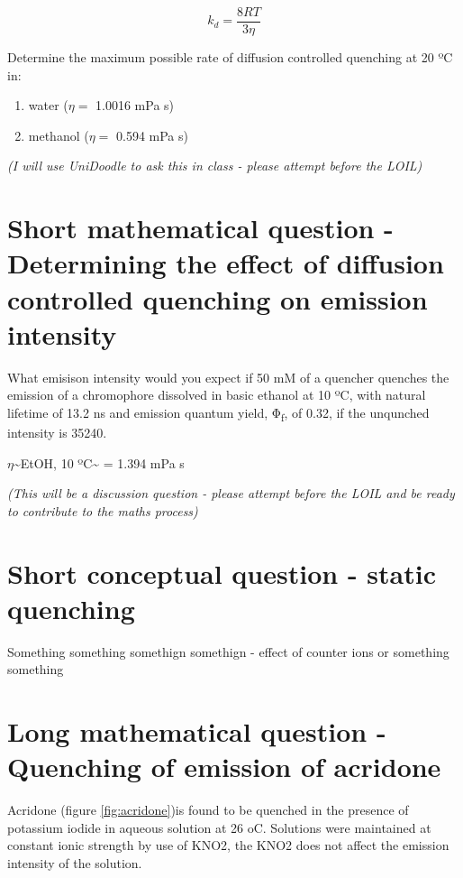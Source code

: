 \documentclass[
]{book}
\providecommand{\tightlist}{%
  \setlength{\itemsep}{0pt}\setlength{\parskip}{0pt}}
\begin{document}
\begin{equation}
k_d = \frac{8RT}{3 \eta}
\label{eq:diffcontrolrate}
\end{equation}

Determine the maximum possible rate of diffusion controlled quenching at 20 ºC in:

\begin{enumerate}
\def\labelenumi{\alph{enumi}.}
\tightlist
\item
  water (\(\eta=\) 1.0016 mPa s)
\item
  methanol (\(\eta=\) 0.594 mPa s)
\end{enumerate}

\emph{(I will use UniDoodle to ask this in class - please attempt before the LOIL)}

\hypertarget{sec:emintquench}{%
\section{Short mathematical question - Determining the effect of diffusion controlled quenching on emission intensity}\label{sec:emintquench}}

What emisison intensity would you expect if 50 mM of a quencher quenches the emission of a chromophore dissolved in basic ethanol at 10 ºC, with natural lifetime of 13.2 ns and emission quantum yield, Φ\textsubscript{f}, of 0.32, if the unqunched intensity is 35240.

\(\eta\)\textasciitilde EtOH, 10 ºC\textasciitilde{} = 1.394 mPa s

\emph{(This will be a discussion question - please attempt before the LOIL and be ready to contribute to the maths process)}

\hypertarget{sec:static}{%
\section{Short conceptual question - static quenching}\label{sec:static}}

Something something somethign somethign - effect of counter ions or something something

\hypertarget{sec:acridone}{%
\section{Long mathematical question - Quenching of emission of acridone}\label{sec:acridone}}

Acridone (figure \ref{fig:acridone})is found to be quenched in the presence of potassium iodide in aqueous solution at 26 oC. Solutions were maintained at constant ionic strength by use of KNO2, the KNO2 does not affect the emission intensity of the solution.
\end{document}

